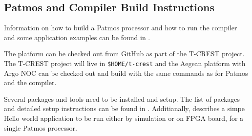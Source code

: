 \documentclass[a4paper,fontsize=10pt,twoside,DIV15,BCOR12mm,headinclude=true,footinclude=false,pagesize,bibtotoc]{scrbook}
\newcommand{\code}[1]{{\texttt{#1}}}
\begin{document}
\subsection{Patmos and Compiler Build Instructions}

Information on how to build a Patmos processor and how to run the compiler and some application examples
can be found in \cite{patmos-handbook}. 


The platform can be checked out from GitHub as part of the T-CREST project.
The T-CREST project will live in \code{\$HOME/t-crest} and the Aegean platform with Argo NOC
can be checked out and build with the same commands as for Patmos and the compiler.%



Several packages and tools need to be installed and setup. The list of packages 
and detailed setup instructions can be found in \cite{patmos-handbook}.
Additianally, \cite{patmos-handbook} describes a simpe Hello world application 
to be run either by simulation or on FPGA board, for a single Patmos processor.
\end{document}
